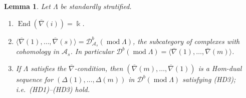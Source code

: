 \documentclass[11pt,reqno]{amsart}
\theoremstyle{plain}
\newtheorem{lemma}[theorem]{Lemma}
\theoremstyle{definition}
\theoremstyle{remark}
\newcommand{\kk}{\Bbbk}
\DeclareMathOperator{\End}{End}
\newcommand{\modd}{\operatorname{mod}}
\newcommand{\Db}{\mathcal{D}^b}
\newcommand{\thick}[1]{\langle #1\rangle}
\newcommand{\nablabar}{\overline{\nabla}}
\newcommand{\cA}{\mathcal{A}}
\begin{document}
\begin{lemma}\label{lem:nablabar}
Let $\Lambda$ be standardly stratified.
\begin{enumerate}
\item $\End(\nablabar(i))=\kk$.
\item $\thick{\nablabar(1),\dots,\nablabar(s)}=\Db_{\cA_s}(\modd\Lambda)$, the subcategory of complexes with cohomology in $\cA_s$. In particular $\Db(\modd\Lambda)=\thick{\nablabar(1),\dots,\nablabar(m)}$.
\item If $\Lambda$ satisfies the $\nablabar$-condition, then $(\nablabar(m),\dots,\nablabar(1))$ is a Hom-dual sequence for $(\Delta(1),\dots,\Delta(m))$ in $\Db(\modd\Lambda)$ satisfying (HD3); i.e.\ (HD1)--(HD3) hold.
\end{enumerate}
\end{lemma}
\end{document}
